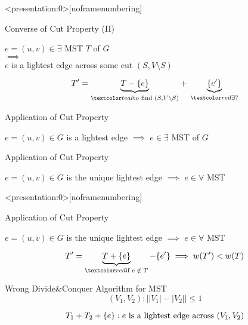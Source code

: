 \begin{frame}<presentation:0>[noframenumbering]
  \begin{exampleblock}{Converse of Cut Property (II)}
    \begin{center}
      $e = (u,v) \in \exists$ MST $T$ of $G$ \\[6pt]
      $\implies$ \\[6pt]
      $e$ is a lightest edge across some cut $(S, V \setminus S)$
    \end{center}
  \end{exampleblock}

  \pause
  \[
    T' = \underbrace{T - \set{e}}_{\teal{\text{to find } (S, V \setminus S)}} +\; \underbrace{\set{e'}}_{\red{\exists?}}
  \]
\end{frame}

\begin{frame}{}
  \begin{exampleblock}{Application of Cut Property }
    \centerline{$e = (u,v) \in G$ is a lightest edge $\implies$ $e \in \exists$ MST of $G$}
  \end{exampleblock}


  \begin{exampleblock}{Application of Cut Property }
    \centerline{$e = (u,v) \in G$ is the unique lightest edge $\implies$ $e \in \forall$ MST}
  \end{exampleblock}
\end{frame}

\begin{frame}<presentation:0>[noframenumbering]
  \begin{exampleblock}{Application of Cut Property }
    \centerline{$e = (u,v) \in G$ is the unique lightest edge $\implies$ $e \in \forall$ MST}
  \end{exampleblock}

  \pause
  \vspace{0.50cm}
  \[
    T' = \underbrace{T + \set{e}}_{\red{\text{if } e \;\notin\; T}} - \set{e'} \implies w(T') < w(T)
  \]
\end{frame}

\begin{frame}{}
  \begin{exampleblock}{Wrong Divide\&Conquer Algorithm for MST }
    \[
      (V_{1}, V_{2}): \Big\rvert |V_{1}| - |V_{2}| \Big\rvert \le 1
    \]
    
    \[
      T_{1} + T_{2} + \{e\}: e \text{ is a lightest edge across } (V_{1}, V_{2})
    \]
  \end{exampleblock}

  \pause
  \vspace{0.30cm}
\end{frame}
